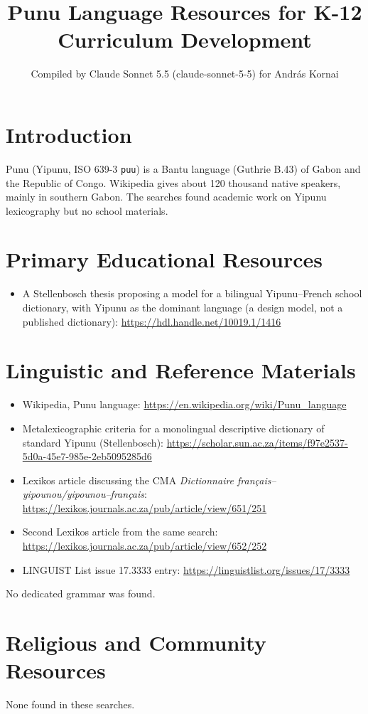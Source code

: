 \documentclass[12pt]{article}
\title{Punu Language Resources for K-12 Curriculum Development}
\author{Compiled by Claude Sonnet 5.5 (claude-sonnet-5-5) for Andr\'as Kornai}
\date{}
\begin{document}
\maketitle

\section{Introduction}
Punu (Yipunu, ISO 639-3 \texttt{puu}) is a Bantu language (Guthrie B.43) of Gabon and the Republic of Congo. Wikipedia gives about 120 thousand native speakers, mainly in southern Gabon. The searches found academic work on Yipunu lexicography but no school materials.

\section{Primary Educational Resources}
\begin{itemize}
\item A Stellenbosch thesis proposing a model for a bilingual Yipunu--French school dictionary, with Yipunu as the dominant language (a design model, not a published dictionary): \url{https://hdl.handle.net/10019.1/1416}
\end{itemize}

\section{Linguistic and Reference Materials}
\begin{itemize}
\item Wikipedia, Punu language: \url{https://en.wikipedia.org/wiki/Punu_language}
\item Metalexicographic criteria for a monolingual descriptive dictionary of standard Yipunu (Stellenbosch): \url{https://scholar.sun.ac.za/items/f97e2537-5d0a-45e7-985e-2eb5095285d6}
\item Lexikos article discussing the CMA \emph{Dictionnaire fran\c{c}ais--yipounou/yipounou--fran\c{c}ais}: \url{https://lexikos.journals.ac.za/pub/article/view/651/251}
\item Second Lexikos article from the same search: \url{https://lexikos.journals.ac.za/pub/article/view/652/252}
\item LINGUIST List issue 17.3333 entry: \url{https://linguistlist.org/issues/17/3333}
\end{itemize}
No dedicated grammar was found.

\section{Religious and Community Resources}
None found in these searches.
\end{document}
